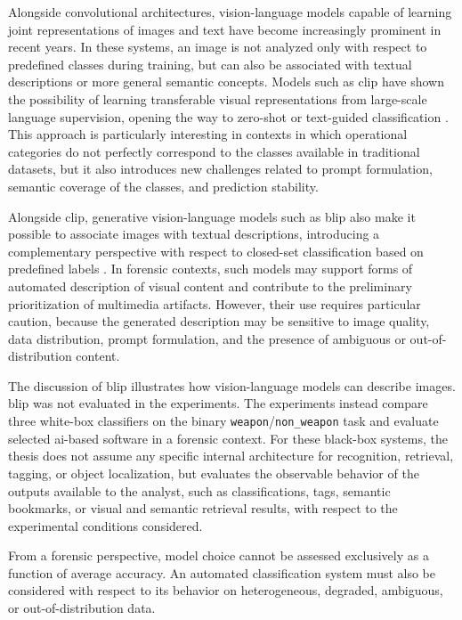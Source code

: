 Alongside convolutional architectures, vision-language models capable of
learning joint representations of images and text have become increasingly
prominent in recent years. In these systems, an image is not analyzed only with
respect to predefined classes during training, but can also be associated with
textual descriptions or more general semantic concepts. Models such as
\gls{clip} have shown the possibility of learning transferable visual
representations from large-scale language supervision, opening the way to
zero-shot or text-guided classification \cite{radford2021learning}. This
approach is particularly interesting in contexts in which operational
categories do not perfectly correspond to the classes available in traditional
datasets, but it also introduces new challenges related to prompt formulation,
semantic coverage of the classes, and prediction stability.

Alongside \gls{clip}, generative vision-language models such as \gls{blip} also
make it possible to associate images with textual descriptions, introducing a
complementary perspective with respect to closed-set classification based on
predefined labels \cite{li2022blip}. In forensic contexts, such models may
support forms of automated description of visual content and contribute to the
preliminary prioritization of multimedia artifacts. However, their use requires
particular caution, because the generated description may be sensitive to image
quality, data distribution, prompt formulation, and the presence of ambiguous
or out-of-distribution content.

The discussion of \gls{blip} illustrates how vision-language models can
describe images. \gls{blip} was not evaluated in the experiments.
The experiments instead compare three white-box classifiers on the binary
\texttt{weapon}/\texttt{non\_weapon} task and evaluate selected \gls{ai}-based
software in a forensic context. For these black-box systems, the thesis
does not assume any
specific internal architecture for recognition, retrieval, tagging, or object
localization, but evaluates the observable behavior of the outputs available to
the analyst, such as classifications, tags, semantic bookmarks, or
visual and semantic retrieval results, with respect to the experimental conditions
considered.


From a forensic perspective, model choice cannot be assessed exclusively as a
function of average accuracy. An automated classification system must also be
considered with respect to its behavior on heterogeneous, degraded, ambiguous,
or out-of-distribution data.


